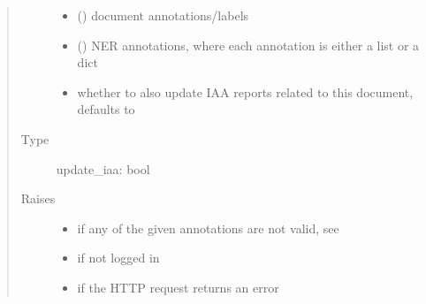 \documentclass[letterpaper,10pt,english]{sphinxmanual}
\begin{document}
\begin{fulllineitems}
\begin{fulllineitems}
\begin{quote}
\begin{description}
\begin{itemize}
\item {} 
\sphinxAtStartPar
{} (\sphinxstyleliteralemphasis{\sphinxupquote{(}}\sphinxstyleliteralemphasis{\sphinxupquote{)}}) \textendash{} document annotations/labels

\item {} 
\sphinxAtStartPar
{} () \textendash{} NER annotations, where each annotation is either a list or a dict

\item {} 
\sphinxAtStartPar
{} \textendash{} whether to also update IAA reports related to this document, defaults to 

\end{itemize}

\item[{Type}] \leavevmode
\sphinxAtStartPar
update\_iaa: bool

\item[{Raises}] \leavevmode\begin{itemize}
\item {} 
\sphinxAtStartPar
{\hyperref[\detokenize{autoapi/pine/client/exceptions/index:pine.client.exceptions.PineClientValueException}]{}} \textendash{} if any of the given annotations are not valid, see {\hyperref[\detokenize{autoapi/pine/client/models/index:pine.client.models.is_valid_annotation}]{}}

\item {} 
\sphinxAtStartPar
{\hyperref[\detokenize{autoapi/pine/client/exceptions/index:pine.client.exceptions.PineClientAuthException}]{}} \textendash{} if not logged in

\item {} 
\sphinxAtStartPar
{\hyperref[\detokenize{autoapi/pine/client/exceptions/index:pine.client.exceptions.PineClientHttpException}]{}} \textendash{} if the HTTP request returns an error


\end{itemize}
\end{description}
\end{quote}
\end{fulllineitems}
\end{fulllineitems}
\end{document}
